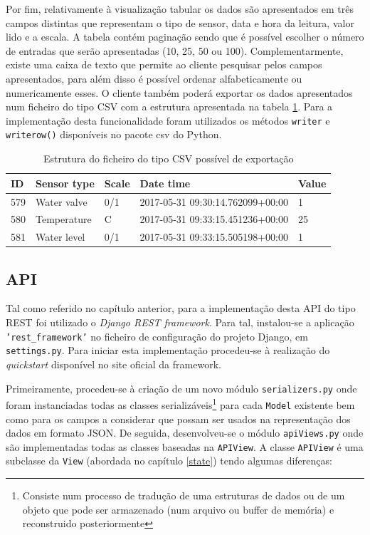 Por fim, relativamente à visualização tabular os dados são apresentados em três campos distintas que representam o tipo de sensor, data e hora da leitura, valor lido e a escala. A tabela contém paginação sendo que é possível escolher o número de entradas que serão apresentadas (10, 25, 50 ou 100). Complementarmente, existe uma caixa de texto que permite ao cliente pesquisar pelos campos apresentados, para além disso é possível ordenar alfabeticamente ou numericamente esses. O cliente também poderá exportar os dados apresentados num ficheiro do tipo \ac{CSV} com a estrutura apresentada na tabela \ref{exportcsv}. Para a implementação desta funcionalidade foram utilizados os métodos \texttt{writer} e \texttt{writerow()} disponíveis no pacote csv do Python.  


\begin{table}[h]
	\centering

	\begin{tabular}{|l|l|l|l|l|}
		\hline
		ID & Sensor type & Scale & Date time & Value \\ \hline
		579 & Water valve & 0/1 & 2017-05-31 09:30:14.762099+00:00 & 1 \\ \hline
		580 & Temperature & C & 2017-05-31 09:33:15.451236+00:00 & 25 \\ \hline
		581 & Water level & 0/1 & 2017-05-31 09:33:15.505198+00:00 & 1 \\ \hline
	\end{tabular}
	\caption{Estrutura do ficheiro do tipo \ac{CSV} possível de exportação}
	\label{exportcsv}
\end{table}




\subsection{\ac{API}}


Tal como referido no capítulo anterior, para a implementação desta API do tipo REST foi utilizado o \textit{Django REST framework}. Para tal, instalou-se a aplicação \texttt{'rest\_framework'} no ficheiro de configuração do projeto Django, em \texttt{settings.py}. Para iniciar esta implementação procedeu-se à realização do \textit{quickstart} disponível no site oficial da framework. 

Primeiramente, procedeu-se à criação de um novo módulo \texttt{serializers.py} onde foram instanciadas todas as classes serializáveis\footnote{Consiste num processo de tradução de uma estruturas de dados ou de um objeto que pode ser armazenado (num arquivo ou buffer de memória) e reconstruido posteriormente  } para cada \texttt{Model} existente bem como  para os campos a considerar que possam ser usados na representação dos dados em formato \ac{JSON}. De seguida, desenvolveu-se o módulo \texttt{apiViews.py} onde são implementadas todas as classes baseadas na \texttt{APIView}. A classe \texttt{APIView} é uma subclasse da \texttt{View} (abordada no capítulo \ref{state}) tendo algumas diferenças: 

